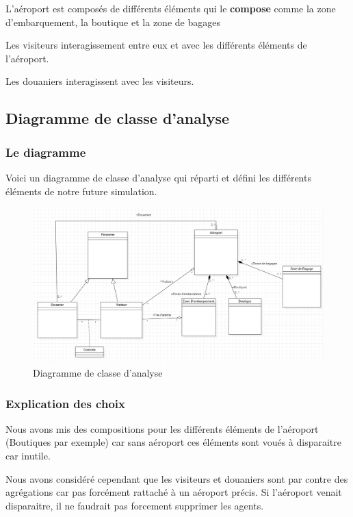 \documentclass[12pt,french]{article} %
\begin{document}
L'aéroport est composés de différents éléments qui le \textbf{compose} comme la zone d'embarquement, la boutique et la zone de bagages

Les visiteurs interagissement entre eux et avec les différents éléments de l'aéroport.

Les douaniers interagissent avec les visiteurs. 


\subsection{Diagramme de classe d'analyse}

\subsubsection{Le diagramme}

Voici un diagramme de classe d'analyse qui réparti et défini les différents éléments de notre future simulation.

\begin{figure}[H]
	\centering
	\includegraphics[scale=0.4]{analyse.png}
	\caption{Diagramme de classe d'analyse}    
\end{figure}

\subsubsection{Explication des choix}

Nous avons mis des compositions pour les différents éléments de l'aéroport (Boutiques par exemple) car sans aéroport ces éléments sont voués à disparaitre car inutile.

Nous avons considéré cependant que les visiteurs et douaniers sont par contre des agrégations car pas forcément rattaché à un aéroport précis. Si l'aéroport venait disparaitre, il ne faudrait pas forcement supprimer les agents.
\end{document}
